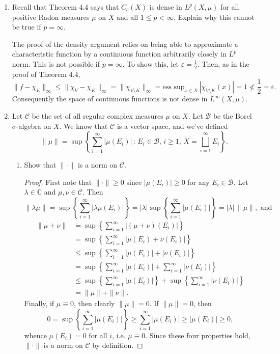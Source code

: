 \documentclass[11pt,oneside,english]{amsart}
\theoremstyle{definition}
\newcommand{\ve}{\varepsilon}
\newcommand{\MC}[1]{\mathcal{#1}}
\newcommand{\MB}[1]{\mathbb{#1}}
\begin{document}
\begin{enumerate}
\pagebreak

\item Recall that Theorem 4.4 says that $C_c(X)$ is dense in $L^p(X,\mu)$ for all positive Radon measures $\mu$ on $X$ and all $1\leq p<\infty$. Explain why this cannot be true if $p=\infty$.

The proof of the density argument relies on being able to approximate a characteristic function by a continuous function arbitrarily closely in $L^p$ norm. This is not possible if $p=\infty$. To show this, let $\ve=\frac{1}{2}$. Then, as in the proof of Theorem 4.4,
\[
\|f-\chi_E\|_\infty\leq\|\chi_V-\chi_K\|_\infty=\|\chi_{V\setminus K}\|_\infty=\text{ess sup}_{x\in X}\,|\chi_{V\setminus K}(x)|=1\not<\frac{1}{2}=\ve. 
\]
Consequently the space of continuous functions is not dense in $L^\infty(X,\mu)$.

\item Let $\MC{C}$ be the set of all regular complex measures $\mu$ on $X$. Let $\MC{B}$ be the Borel $\sigma$-algebra on $X$. We know that $\MC{C}$ is a vector space, and we've defined
\[
\|\mu\|=\sup\left\{\sum_{i=1}^\infty|\mu(E_i)|\,:\, E_i\in\MC{B},\,i\geq1,\,X=\bigsqcup_{i=1}^\infty E_i\right\}.
\]
\begin{enumerate}
\item Show that $\|\cdot\|$ is a norm on $\MC{C}$.

\begin{proof}
First note that $\|\cdot\|\geq0$ since $|\mu(E_i)|\geq0$ for any $E_i\in\MC{B}$. Let $\lambda\in\MB{C}$ and $\mu,\nu\in\MC{C}$. Then
\[
\|\lambda\mu\|=\sup\left\{\sum_{i=1}^\infty|\lambda \mu(E_i)|\right\}=|\lambda|\sup\left\{\sum_{i=1}^\infty|\mu(E_i)|\right\}=|\lambda|\,\|\mu\|,\text{ and}
\]
\begin{align*}
\|\mu+\nu\|&=\sup\left\{\sum_{i=1}^\infty|(\mu+\nu)(E_i)|\right\}\\[2mm]
&=\sup\left\{\sum_{i=1}^\infty|\mu(E_i)+\nu(E_i)|\right\}\\[2mm]
&\leq\sup\left\{\sum_{i=1}^\infty|\mu(E_i)|+|\nu(E_i)|\right\}\\[2mm]
&=\sup\left\{\sum_{i=1}^\infty|\mu(E_i)|+\sum_{i=1}^\infty|\nu(E_i)|\right\}\\[2mm]
&\leq\sup\left\{\sum_{i=1}^\infty|\mu(E_i)|\right\}+\sup\left\{\sum_{i=1}^\infty|\nu(E_i)|\right\}\\[2mm]
&=\|\mu\|+\|\nu\|.
\end{align*}
Finally, if $\mu\equiv0$, then clearly $\|\mu\|=0$. If $\|\mu\|=0$, then
\[
0=\sup\left\{\sum_{i=1}^\infty|\mu(E_i)|\right\}\geq\sum_{i=1}^\infty|\mu(E_i)|\geq|\mu(E_i)|\geq0,
\]
whence $\mu(E_i)=0$ for all $i$, i.e. $\mu\equiv0$. Since these four properties hold, $\|\cdot\|$ is a norm on $\MC{C}$ by definition.
\end{proof}


\end{enumerate}
\end{enumerate}
\end{document}
